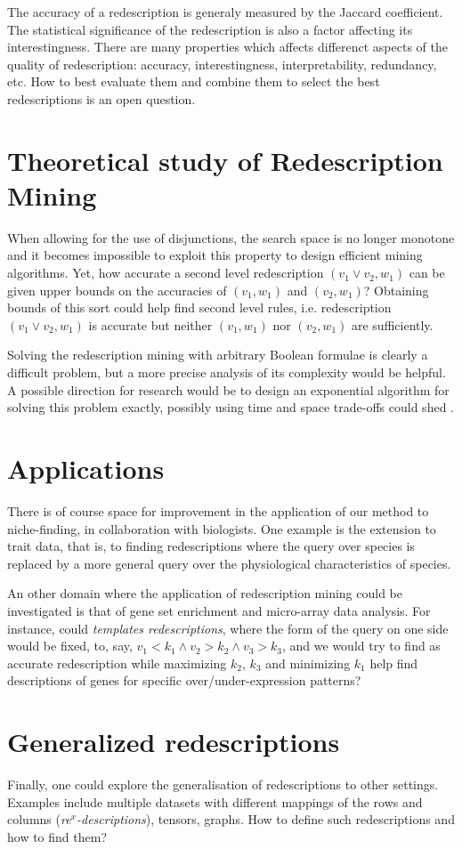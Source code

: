 \documentclass[a4paper,10pt]{article}
\begin{document}
The accuracy of a redescription is generaly measured by the Jaccard
coefficient. The statistical significance of the redescription is also
a factor affecting its interestingness. There are many properties
which affects differenct aspects of the quality of redescription:
accuracy, interestingness, interpretability, redundancy, etc. How to
best evaluate them and combine them to select the best redescriptions
is an open question.

\section{Theoretical study of Redescription Mining}
When allowing for the use of disjunctions, the search space is no
longer monotone and it becomes impossible to exploit this property to
design efficient mining algorithms.  Yet, how accurate a second level
redescription $(v_1 \lor v_2, w_1)$ can be given upper bounds on the
accuracies of $(v_1, w_1)$ and $(v_2, w_1)$?  Obtaining bounds of this
sort could help find second level rules, i.e. redescription $(v_1 \lor
v_2, w_1)$ is accurate but neither $(v_1, w_1)$ nor $(v_2, w_1)$ are
sufficiently.

Solving the redescription mining with arbitrary Boolean formulae is
clearly a difficult problem, but a more precise analysis of its
complexity would be helpful.  A possible direction for research would
be to design an exponential algorithm for solving this problem
exactly, possibly using time and space trade-offs could shed .

\section{Applications}
There is of course space for improvement in the application of our
method to niche-finding, in collaboration with biologists.  One
example is the extension to trait data, that is, to finding
redescriptions where the query over species is replaced by a more
general query over the physiological characteristics of species.

An other domain where the application of redescription mining could be
investigated is that of gene set enrichment and micro-array data
analysis. For instance, could \emph{templates redescriptions}, where
the form of the query on one side would be fixed, to, say, $v_1 < k_1
\land v_2>k_2 \land v_3>k_3$, and we would try to find as accurate
redescription while maximizing $k_2$, $k_3$ and minimizing $k_1$ help
find descriptions of genes for specific over/under-expression
patterns?

\section{Generalized redescriptions}
Finally, one could explore the generalisation of redescriptions to
other settings. Examples include multiple datasets with different
mappings of the rows and columns (\emph{re$^x$-descriptions}),
tensors, graphs.  How to define such redescriptions and how to find
them?



\end{document}
